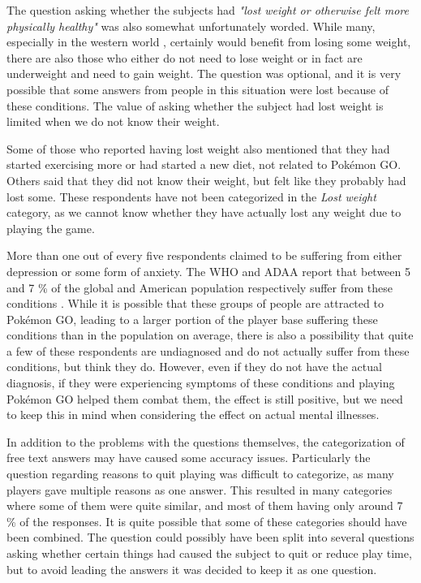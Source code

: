 
The question asking whether the subjects had \emph{"lost weight or otherwise felt more physically healthy"} was also somewhat unfortunately worded. While many, especially in the western world , certainly would benefit from losing some weight, there are also those who either do not need to lose weight or in fact are underweight and need to gain weight. The question was optional, and it is very possible that some answers from people in this situation were lost because of these conditions. The value of asking whether the subject had lost weight is limited when we do not know their weight.

Some of those who reported having lost weight also mentioned that they had started exercising more or had started a new diet, not related to Pokémon GO. Others said that they did not know their weight, but felt like they probably had lost some. These respondents have not been categorized in the \emph{Lost weight} category, as we cannot know whether they have actually lost any weight due to playing the game. 

More than one out of every five respondents claimed to be suffering from either depression or some form of anxiety. The WHO and ADAA report that between 5 and 7 \% of the global and American population respectively suffer from these conditions . While it is possible that these groups of people are attracted to Pokémon GO, leading to a larger portion of the player base suffering these conditions than in the population on average, there is also a possibility that quite a few of these respondents are undiagnosed and do not actually suffer from these conditions, but think they do. However, even if they do not have the actual diagnosis, if they were experiencing symptoms of these conditions and playing Pokémon GO helped them combat them, the effect is still positive, but we need to keep this in mind when considering the effect on actual mental illnesses.

In addition to the problems with the questions themselves, the categorization of free text answers may have caused some accuracy issues. Particularly the question regarding reasons to quit playing was difficult to categorize, as many players gave multiple reasons as one answer. This resulted in many categories where some of them were quite similar, and most of them having only around 7 \% of the responses. It is quite possible that some of these categories should have been combined. The question could possibly have been split into several questions asking whether certain things had caused the subject to quit or reduce play time, but to avoid leading the answers it was decided to keep it as one question.

